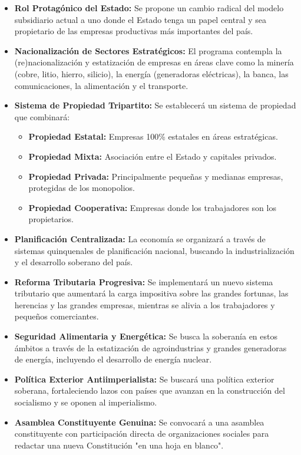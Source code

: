 \documentclass[a4paper, 11pt]{article}
\begin{document}
\begin{itemize}
    \item \textbf{Rol Protagónico del Estado:} Se propone un cambio radical del modelo subsidiario actual a uno donde el Estado tenga un papel central y sea propietario de las empresas productivas más importantes del país.

    \item \textbf{Nacionalización de Sectores Estratégicos:} El programa contempla la (re)nacionalización y estatización de empresas en áreas clave como la minería (cobre, litio, hierro, silicio), la energía (generadoras eléctricas), la banca, las comunicaciones, la alimentación y el transporte.

    \item \textbf{Sistema de Propiedad Tripartito:} Se establecerá un sistema de propiedad que combinará:
    \begin{itemize}
        \item \textbf{Propiedad Estatal:} Empresas 100\% estatales en áreas estratégicas.
        \item \textbf{Propiedad Mixta:} Asociación entre el Estado y capitales privados.
        \item \textbf{Propiedad Privada:} Principalmente pequeñas y medianas empresas, protegidas de los monopolios.
        \item \textbf{Propiedad Cooperativa:} Empresas donde los trabajadores son los propietarios.
    \end{itemize}

    \item \textbf{Planificación Centralizada:} La economía se organizará a través de sistemas quinquenales de planificación nacional, buscando la industrialización y el desarrollo soberano del país.

    \item \textbf{Reforma Tributaria Progresiva:} Se implementará un nuevo sistema tributario que aumentará la carga impositiva sobre las grandes fortunas, las herencias y las grandes empresas, mientras se alivia a los trabajadores y pequeños comerciantes.

    \item \textbf{Seguridad Alimentaria y Energética:} Se busca la soberanía en estos ámbitos a través de la estatización de agroindustrias y grandes generadoras de energía, incluyendo el desarrollo de energía nuclear.

    \item \textbf{Política Exterior Antiimperialista:} Se buscará una política exterior soberana, fortaleciendo lazos con países que avanzan en la construcción del socialismo y se oponen al imperialismo.

    \item \textbf{Asamblea Constituyente Genuina:} Se convocará a una asamblea constituyente con participación directa de organizaciones sociales para redactar una nueva Constitución "en una hoja en blanco".
\end{itemize}
\end{document}

